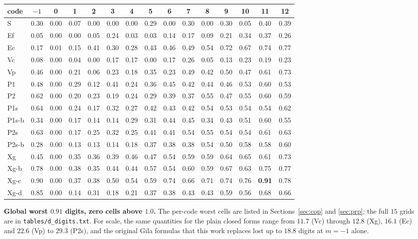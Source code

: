 \documentclass[11pt]{article}
\theoremstyle{remark}
\newcommand{\code}[1]{\texttt{#1}}
\begin{document}
\begin{center}\footnotesize
\begin{tabular}{@{}lcccccccccccccc@{}}
\toprule
code & $-1$ & 0 & 1 & 2 & 3 & 4 & 5 & 6 & 7 & 8 & 9 & 10 & 11 & 12\\
\midrule
S     & 0.30 & 0.00 & 0.07 & 0.00 & 0.00 & 0.00 & 0.29 & 0.00 & 0.30 & 0.00 & 0.30 & 0.05 & 0.40 & 0.39\\
Ef    & 0.05 & 0.00 & 0.00 & 0.05 & 0.24 & 0.03 & 0.03 & 0.14 & 0.17 & 0.09 & 0.21 & 0.34 & 0.37 & 0.26\\
Ec    & 0.17 & 0.01 & 0.15 & 0.41 & 0.30 & 0.28 & 0.43 & 0.46 & 0.49 & 0.54 & 0.72 & 0.67 & 0.74 & 0.77\\
Vc    & 0.08 & 0.00 & 0.04 & 0.00 & 0.17 & 0.17 & 0.00 & 0.17 & 0.26 & 0.05 & 0.13 & 0.23 & 0.19 & 0.23\\
Vp    & 0.46 & 0.00 & 0.21 & 0.06 & 0.23 & 0.18 & 0.35 & 0.23 & 0.49 & 0.42 & 0.50 & 0.47 & 0.61 & 0.73\\
P1    & 0.48 & 0.00 & 0.29 & 0.12 & 0.41 & 0.24 & 0.36 & 0.45 & 0.42 & 0.44 & 0.46 & 0.53 & 0.60 & 0.53\\
P2    & 0.62 & 0.00 & 0.20 & 0.23 & 0.19 & 0.24 & 0.29 & 0.39 & 0.37 & 0.55 & 0.47 & 0.55 & 0.60 & 0.59\\
P1s   & 0.64 & 0.00 & 0.24 & 0.17 & 0.32 & 0.27 & 0.42 & 0.43 & 0.42 & 0.54 & 0.53 & 0.54 & 0.54 & 0.62\\
P1s-b & 0.34 & 0.00 & 0.17 & 0.14 & 0.14 & 0.29 & 0.31 & 0.44 & 0.45 & 0.34 & 0.43 & 0.51 & 0.60 & 0.55\\
P2s   & 0.63 & 0.00 & 0.17 & 0.25 & 0.32 & 0.25 & 0.41 & 0.41 & 0.54 & 0.55 & 0.54 & 0.54 & 0.61 & 0.63\\
P2s-b & 0.28 & 0.00 & 0.13 & 0.13 & 0.14 & 0.18 & 0.37 & 0.38 & 0.38 & 0.54 & 0.50 & 0.58 & 0.58 & 0.60\\
Xg    & 0.45 & 0.00 & 0.35 & 0.36 & 0.39 & 0.46 & 0.47 & 0.54 & 0.59 & 0.59 & 0.64 & 0.65 & 0.61 & 0.73\\
Xg-b  & 0.78 & 0.00 & 0.38 & 0.35 & 0.44 & 0.44 & 0.57 & 0.54 & 0.60 & 0.59 & 0.67 & 0.63 & 0.75 & 0.77\\
Xg-c  & 0.90 & 0.00 & 0.37 & 0.38 & 0.50 & 0.54 & 0.59 & 0.74 & 0.66 & 0.71 & 0.74 & 0.76 & \textbf{0.91} & 0.78\\
Xg-d  & 0.85 & 0.00 & 0.14 & 0.31 & 0.18 & 0.21 & 0.37 & 0.38 & 0.43 & 0.43 & 0.59 & 0.56 & 0.68 & 0.66\\
\bottomrule
\end{tabular}
\end{center}
\noindent
\textbf{Global worst $0.91$ digits, zero cells above $1.0$.} The per-code worst cells are
listed in Sections~\ref{sec:cop} and \ref{sec:prp}; the full $15$ grids are in
\code{tables/d\_digits.txt}. For scale, the same quantities for the plain closed forms
range from $11.7$ (Vc) through $12.8$ (Xg), $16.1$ (Ec) and $22.6$ (Vp) to $29.3$
(P2s), and the original Gila formulas that this work replaces lost up to $18.8$ digits at
$m = -1$ alone.
\end{document}
